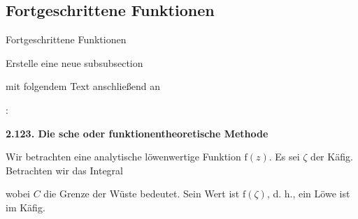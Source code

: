 \subsection{Fortgeschrittene Funktionen}
\begin{frame}[c]
	\begin{center}
		\large Fortgeschrittene Funktionen
	\end{center}
\end{frame}
\begin{frame}[fragile]
	\Aufgabee
		Erstelle eine neue subsubsection
		
		\textrm{}
		
		mit folgendem Text anschließend an
		
		\textrm{}:
	\begin{outputbox}
		{ \large\textbf{2.123. Die  sche oder funktionentheoretische Methode}}
		
		Wir betrachten eine analytische löwenwertige Funktion $\mathrm{f}(z)$. Es sei $\zeta$ der Käfig. Betrachten wir das Integral
		
	    wobei $C$ die Grenze der Wüste bedeutet. Sein Wert ist $\mathrm{f}(\zeta)$, d. h., ein Löwe ist im Käfig.		
	\end{outputbox}
	\vspace{0.3cm}
\end{frame}
